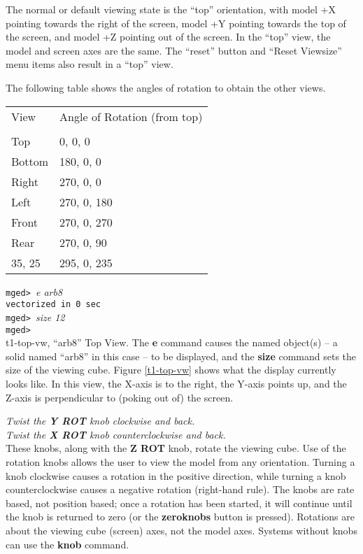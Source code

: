 The normal or default viewing state is the ``top'' orientation,
with model +X pointing towards the right of the screen,
model +Y pointing towards the top of the screen,
and model +Z pointing out of the screen.
In the ``top'' view, the model and screen axes are the same.
The ``reset'' button and ``Reset Viewsize'' menu items also
result in a ``top'' view.

The following table shows the angles of rotation to obtain the other views.
\begin{tabular}{l l}
View    &            Angle of Rotation (from top) \\
 \\
Top      &                     0, 0, 0 \\
Bottom   &                   180, 0, 0 \\
Right    &                   270, 0, 0 \\
Left     &                  270, 0, 180 \\
Front    &                  270, 0, 270 \\
Rear     &                  270, 0, 90 \\
35, 25   &                  295, 0, 235 \\
\end{tabular}

\noindent
{\tt mged>\ }{\em e arb8}\\
{\tt vectorized in 0 sec}\\
{\tt mged>\ }{\em size 12}\\
{\tt mged> }\\

\mfig t1-top-vw, ``arb8'' Top View.
The {\bf e} command causes the named object(s) -- a solid named ``arb8'' 
in this case
-- to be displayed, and the {\bf size} command sets the size of the
viewing cube. Figure \ref{t1-top-vw} shows what the display currently
looks like.  In this view, the X-axis is to the right, the Y-axis points
up, and the Z-axis is perpendicular to (poking out of) the screen.

\noindent
{\em Twist the {\bf Y ROT} knob clockwise and back.}\\
{\em Twist the {\bf X ROT} knob counterclockwise and back.}\\

These knobs, along with the {\bf Z ROT} knob, rotate the viewing cube.
Use of the rotation
knobs allows the user to view the model from any orientation.
Turning a knob clockwise causes a rotation in the positive direction,
while turning a knob counterclockwise causes a negative rotation
(right-hand rule).  The knobs are rate based, not position based;
once a rotation has been started, it will continue until the
knob is returned to zero (or the {\bf zeroknobs} button is pressed).
Rotations are about the viewing cube (screen) axes, not the model axes.
Systems without knobs can use the {\bf knob} command.

